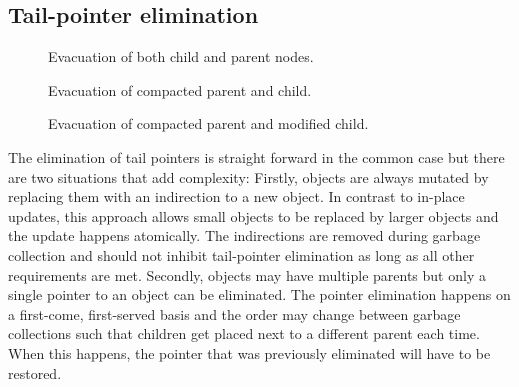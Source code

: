 \documentclass[a4paper,oneside]{memoir}
\begin{document}
\subsection{Tail-pointer elimination}

\begin{figure}[t]
  
  \caption{Evacuation of both child and parent nodes.}
  \label{parent_child}
\end{figure}

\begin{figure}[b]
  
  \caption{Evacuation of compacted parent and child.}
  \label{compacted_parent_child}
\end{figure}

\begin{figure}[t]
  
  \caption{Evacuation of compacted parent and modified child.}
  \label{modified_child}
\end{figure}

The elimination of tail pointers is straight forward in the common case but there
are two situations that add complexity: Firstly, objects are always mutated by
replacing them with an indirection to a new object. In contrast to in-place updates,
this approach allows small objects to be replaced by larger objects and the update
happens atomically. The indirections are removed during garbage collection
and should not inhibit tail-pointer elimination as long as all other requirements
are met.
Secondly, objects may have multiple parents but only a single pointer to an object
can be eliminated. The pointer elimination happens on a first-come, first-served
basis and the order may change between garbage collections such that children get
placed next to a different parent each time. When this happens, the pointer
that was previously eliminated will have to be restored.
\end{document}
